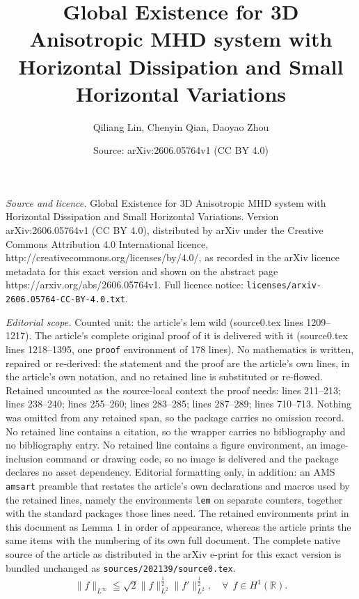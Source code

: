 \documentclass[10pt,a4paper]{amsart}
\title{Global Existence for 3D Anisotropic MHD system with Horizontal Dissipation and Small Horizontal Variations}
\author{Qiliang Lin, Chenyin Qian, Daoyao Zhou}
\date{Source: arXiv:2606.05764v1 (CC BY 4.0)}
\begin{document}
\maketitle

\noindent\emph{Source and licence.} Global Existence for 3D Anisotropic MHD system with Horizontal Dissipation and Small Horizontal Variations. Version arXiv:2606.05764v1 (CC BY 4.0), distributed by arXiv under the Creative Commons Attribution 4.0 International licence, http://creativecommons.org/licenses/by/4.0/, as recorded in the arXiv licence metadata for this exact version and shown on the abstract page https://arxiv.org/abs/2606.05764v1. Full licence notice: \texttt{licenses/arxiv-2606.05764-CC-BY-4.0.txt}.\par\smallskip

\noindent\textit{Editorial scope.} Counted unit: the article's lem wild (source0.tex lines 1209--1217). The article's complete original proof of it is delivered with it (source0.tex lines 1218--1395, one \texttt{proof} environment of 178 lines). No mathematics is written, repaired or re-derived: the statement and the proof are the article's own lines, in the article's own notation, and no retained line is substituted or re-flowed.  Retained uncounted as the source-local context the proof needs: lines 211--213; lines 238--240; lines 255--260; lines 283--285; lines 287--289; lines 710--713.  Nothing was omitted from any retained span, so the package carries no omission record.  No retained line contains a citation, so the wrapper carries no bibliography and no bibliography entry.  No retained line contains a figure environment, an image-inclusion command or drawing code, so no image is delivered and the package declares no asset dependency.  Editorial formatting only, in addition: an AMS \texttt{amsart} preamble that restates the article's own declarations and macros used by the retained lines, namely the environments \texttt{lem} on separate counters, together with the standard packages those lines need.  The retained environments print in this document as Lemma 1 in order of appearance, whereas the article prints the same items with the numbering of its own full document.  The complete native source of the article as distributed in the arXiv e-print for this exact version is bundled unchanged as \texttt{sources/202139/source0.tex}.
\begin{align}\label{L^infty_1D}
	\|f\|_{L^\infty}\leqq \sqrt{2}\|f\|_{L^2}^\frac12\|f'\|_{L^2}^\frac12, \quad\forall\ \  f\in H^1(\mathbb{R}).
\end{align}
\end{document}
